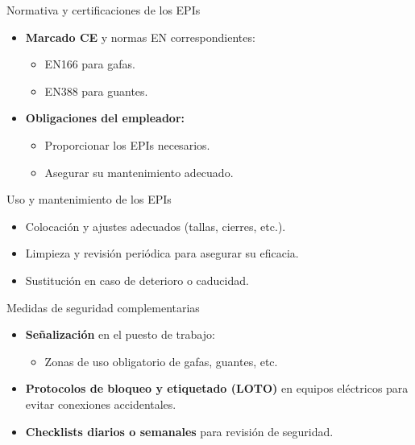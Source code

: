 \documentclass{beamer}
\begin{document}
\begin{frame}{Normativa y certificaciones de los EPIs}
    \begin{itemize}
        \item \textbf{Marcado CE} y normas EN correspondientes:
        \begin{itemize}
            \item EN166 para gafas.
            \item EN388 para guantes.
        \end{itemize}
        \item \textbf{Obligaciones del empleador:}
        \begin{itemize}
            \item Proporcionar los EPIs necesarios.
            \item Asegurar su mantenimiento adecuado.
        \end{itemize}
    \end{itemize}
\end{frame}

\begin{frame}{Uso y mantenimiento de los EPIs}
    \begin{itemize}
        \item Colocaci\'on y ajustes adecuados (tallas, cierres, etc.).
        \item Limpieza y revisi\'on peri\'odica para asegurar su eficacia.
        \item Sustituci\'on en caso de deterioro o caducidad.
    \end{itemize}
\end{frame}

\begin{frame}{Medidas de seguridad complementarias}
    \begin{itemize}
        \item \textbf{Se\~nalizaci\'on} en el puesto de trabajo:
        \begin{itemize}
            \item Zonas de uso obligatorio de gafas, guantes, etc.
        \end{itemize}
        \item \textbf{Protocolos de bloqueo y etiquetado (LOTO)} en equipos el\'ectricos para evitar conexiones accidentales.
        \item \textbf{Checklists diarios o semanales} para revisi\'on de seguridad.
    \end{itemize}
\end{frame}
\end{document}
